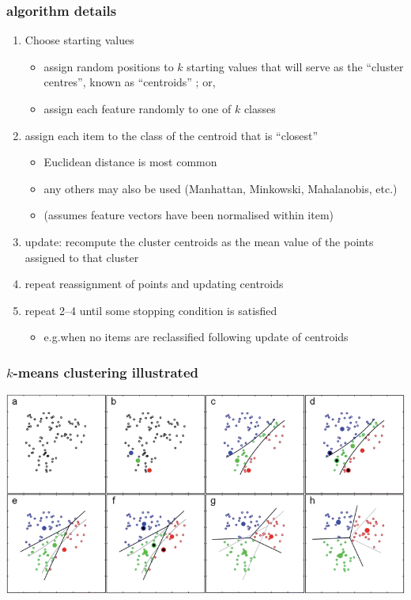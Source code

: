 \documentclass{beamer}
\begin{document}
\begin{frame}
	\frametitle{algorithm details}
	\begin{enumerate}
		\item \pause Choose starting values
		\begin{itemize}
			\item \pause assign random positions to $k$ starting values that will
			serve as the ``cluster centres'', known as ``centroids'' ; or,
			\item assign each feature randomly to one of $k$ classes
		\end{itemize}
		\item \pause assign each item to the class of the centroid that is ``closest''
		\begin{itemize}
			\item Euclidean distance is most common
			\item any others may also be used (Manhattan, Minkowski,
			Mahalanobis, etc.)
			\item (assumes feature vectors have been normalised within item)
		\end{itemize}
		\item  \pause update: recompute the cluster centroids as the mean value of
		the points assigned to that cluster
		\item  \pause repeat reassignment of points and updating centroids
		\item  \pause repeat 2--4 until some stopping condition is satisfied
		\begin{itemize}
			\item e.g.\@ when no items are reclassified following update of centroids
		\end{itemize}
		
	\end{enumerate}
\end{frame}

\begin{frame}
	\frametitle{$k$-means clustering illustrated}
	\includegraphics[width=\textwidth]{figures/kmeans.png}
\end{frame}
\end{document}
